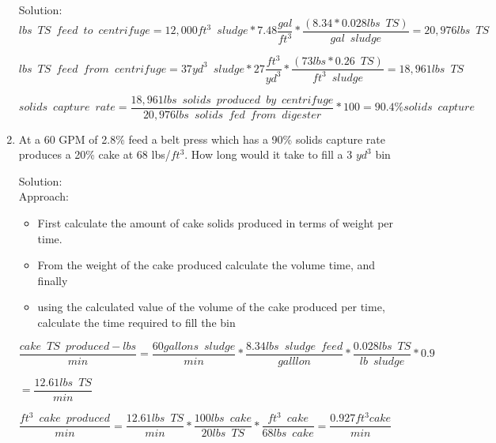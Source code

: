 \documentclass{article}
\begin{document}
\begin{enumerate}
 

Solution:\\
{
$
	lbs \enspace TS \enspace feed \enspace to \enspace centrifuge
	=
	12,000 ft^3 \enspace sludge
	*
	7.48 
	\dfrac
	{
	gal
	}
	{
	ft^3
	}
	*
	\dfrac
	{
	(8.34*0.028 lbs \enspace TS )
	}
	{gal \enspace sludge
	}
	=20,976 {lbs \enspace TS}
$
}

{
$
	lbs \enspace TS \enspace feed \enspace from \enspace centrifuge
	=
	37 yd^3 \enspace sludge
	*
	27 
	\dfrac
	{
	ft^3
	}
	{
	yd^3
	}
	*
	\dfrac
	{
	(73 lbs *0.26 \enspace TS )
	}
	{ft^3 \enspace sludge
	}
	=18,961 {lbs \enspace TS}
$
}

{
$
	solids \enspace capture \enspace rate
	=
	\dfrac
	{
	18,961 lbs \enspace solids \enspace produced 		\enspace by \enspace centrifuge
	}
	{
	20,976 lbs \enspace solids \enspace fed 			\enspace from \enspace digester
	}
	*
	100 
	=\boxed
	{
	90.4\% solids \enspace capture
	}
$
}

\item At a 60 GPM of 2.8\% feed a belt press which has a 90\% solids capture rate produces a 20\% cake at 68 lbs/$ft^3$.  How long would it take to fill a 3 $yd^3$ bin  
	
	
Solution:\\
Approach:
\begin{itemize}
\item First calculate the amount of cake solids produced in terms of weight per time.
\item From the weight of the cake produced calculate the volume time, and finally
\item using the calculated value of the volume of the cake produced per time, calculate the time required to fill the bin\\
\end{itemize}

{$\dfrac{cake \enspace TS \enspace produced - lbs}{min}= \dfrac {60 gallons \enspace sludge}{min}*\dfrac {8.34 lbs \enspace sludge \enspace feed}{galllon}*\dfrac{0.028 lbs \enspace TS}{lb \enspace sludge}*0.9$}\\
\vspace{3mm}

{$=\dfrac{12.61lbs \enspace TS}{min}$}\\
\vspace{3mm}

{$\dfrac{ft^3 \enspace cake \enspace produced}{min}=\dfrac{12.61lbs \enspace TS}{min}*\dfrac{100 lbs \enspace cake}{20lbs \enspace TS}*\dfrac{ft^3 \enspace cake}{68 lbs \enspace cake} = \dfrac{0.927ft^3 cake}{min}$}\\
\vspace{3mm}


\end{enumerate}
\end{document}
